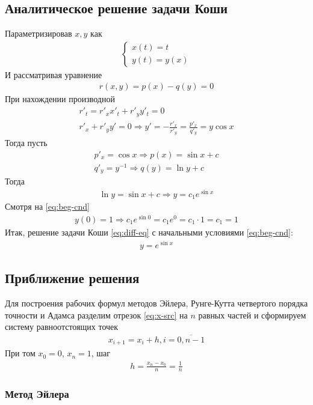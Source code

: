 \subsection{Аналитическое решение задачи Коши}
Параметризировав \(x, y\) как
\begin{align}
	\begin{cases}
		x(t) = t \\
		y(t) = y(x)
	\end{cases}
\end{align}
И рассматривая уравнение
\begin{align}
	r(x, y) = p(x) - q(y) = 0
\end{align}
При нахождении производной
\begin{align}
	r'_t = r'_x x'_t + r'_y y'_t = 0 \\
	r'_x + r'_y y' = 0 \Longrightarrow y' = -\frac{r'_x}{r'_y} = \frac{p'_x}{q'_y} = y \cos x
\end{align}
Тогда пусть
\begin{align}
	p'_x = \cos x \Longrightarrow p(x) = \sin x + c \\
	q'_y = y^{-1} \Longrightarrow q(y) = \ln y + c
\end{align}
Тогда
\begin{align}
	\ln y = \sin x + c \Longrightarrow y = c_1 e^{\sin x}
\end{align}
Смотря на \cref{eq:beg-cnd}
\begin{align}
	y(0) = 1 \Longrightarrow c_1 e^{\sin 0} = c_1 e^0 = c_1 \cdot 1 = c_1 = 1
\end{align}
Итак, решение задачи Коши \cref{eq:diff-eq} с начальными условиями \cref{eq:beg-cnd}:
\begin{align}
	y = e^{\sin x}
\end{align}
\subsection{Приближение решения}
Для построения рабочих формул методов Эйлера, Рунге-Кутта четвертого порядка точности и Адамса разделим отрезок \cref{eq:x-src} на \(n\) равных частей и сформируем систему равноотстоящих точек
\begin{align}
	x_{i+1} = x_i + h, i = \overline{0, n - 1}
\end{align}
При том \(x_0 = 0\), \(x_n = 1\), шаг
\begin{align}
	h = \frac{x_n - x_0}{n} = \frac{1}{n}
\end{align}
\subsubsection{Метод Эйлера}

